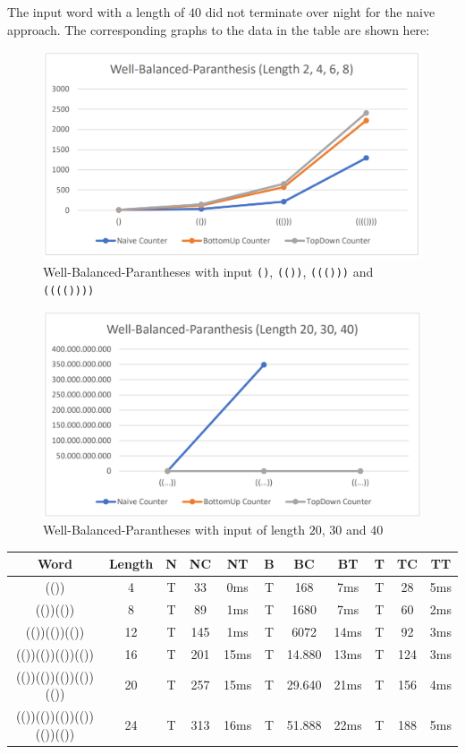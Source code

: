 \documentclass[a4paper, 11pt]{article}
\begin{document}
The input word with a length of $40$ did not terminate over night for the naive approach. The corresponding graphs to the data in the table are shown here:
\\
\begin{figure}[H]
\includegraphics[scale=0.5]{diagrams/WBP_1.png}
\caption{Well-Balanced-Parantheses with input \texttt{()}, \texttt{(())}, \texttt{((()))} and \texttt{(((())))}}
\end{figure}

\begin{figure}[H]
\includegraphics[scale=0.5]{diagrams/WBP_2.png}
\caption{Well-Balanced-Parantheses with input of length $20$, $30$ and $40$}
\end{figure}

\begin{small}
\begin{tabular}{|c|c||c|c|c||c|c|c||c|c|c|}
\hline
Word & Length & N & NC & NT & B & BC & BT & T & TC & TT \\
\hline
\hline
(()) & 4 & T & 33 & 0ms & T & 168 & 7ms & T & 28 & 5ms \\
\hline
(())(()) & 8 & T & 89 & 1ms & T & 1680 & 7ms & T & 60 & 2ms \\
\hline
(())(())(()) & 12 & T & 145 & 1ms & T & 6072 & 14ms & T & 92 & 3ms \\
\hline
(())(())(())(()) & 16 & T & 201 & 15ms & T & 14.880 & 13ms & T & 124 & 3ms \\
\hline
(())(())(())(())(()) & 20 & T & 257 & 15ms & T & 29.640 & 21ms & T & 156 & 4ms \\
\hline
(())(())(())(())(())(()) & 24 & T & 313 & 16ms & T & 51.888 & 22ms & T & 188 & 5ms \\
\hline

\end{tabular}
\end{small}
\end{document}
